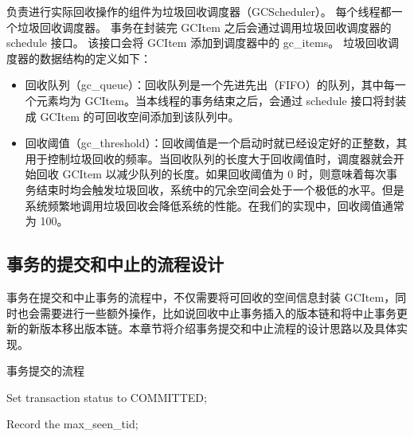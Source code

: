 负责进行实际回收操作的组件为垃圾回收调度器（GCScheduler）。
每个线程都一个垃圾回收调度器。
事务在封装完 GCItem 之后会通过调用垃圾回收调度器的 schedule 接口。
该接口会将 GCItem 添加到调度器中的 gc\_items。
垃圾回收调度器的数据结构的定义如下：
\begin{itemize}
    \item 回收队列（gc\_queue）：回收队列是一个先进先出（FIFO）的队列，其中每一个元素均为 GCItem。当本线程的事务结束之后，会通过 schedule 接口将封装成 GCItem 的可回收空间添加到该队列中。
    \item 回收阈值（gc\_threshold）：回收阈值是一个启动时就已经设定好的正整数，其用于控制垃圾回收的频率。当回收队列的长度大于回收阈值时，调度器就会开始回收 GCItem 以减少队列的长度。如果回收阈值为 0 时，则意味着每次事务结束时均会触发垃圾回收，系统中的冗余空间会处于一个极低的水平。但是系统频繁地调用垃圾回收会降低系统的性能。在我们的实现中，回收阈值通常为 100。
\end{itemize}



\subsection{事务的提交和中止的流程设计}
\label{ssec:commit-abort}

事务在提交和中止事务的流程中，不仅需要将可回收的空间信息封装 GCItem，同时也会需要进行一些额外操作，比如说回收中止事务插入的版本链和将中止事务更新的新版本移出版本链。本章节将介绍事务提交和中止流程的设计思路以及具体实现。

\begin{algorithm}[h]
    \caption{事务提交的流程}
    \label{alg:commit}
    \BlankLine
    Set transaction status to COMMITTED;



    Record the max\_seen\_tid;



\end{algorithm}

